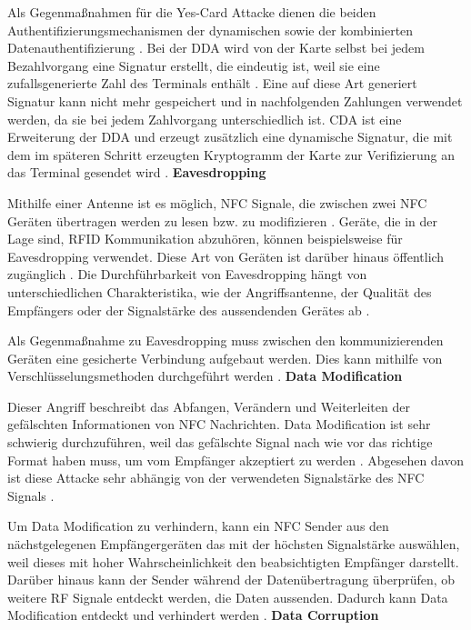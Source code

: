 Als Gegenmaßnahmen für die Yes-Card Attacke dienen die beiden Authentifizierungsmechanismen der dynamischen sowie der kombinierten Datenauthentifizierung \cite{nfcRelayWithOffTheShelfHardAndSoftware}. Bei der DDA wird von der Karte selbst bei jedem Bezahlvorgang eine Signatur erstellt, die eindeutig ist, weil sie eine zufallsgenerierte Zahl des Terminals enthält \cite{dda}. Eine auf diese Art generiert Signatur kann nicht mehr gespeichert und in nachfolgenden Zahlungen verwendet werden, da sie bei jedem Zahlvorgang unterschiedlich ist. CDA ist eine Erweiterung der DDA und erzeugt zusätzlich eine dynamische Signatur, die mit dem im späteren Schritt erzeugten Kryptogramm der Karte zur Verifizierung an das Terminal gesendet wird \cite{emvbook2}. 
\newline
\newline
\textbf{Eavesdropping}

Mithilfe einer Antenne ist es möglich, NFC Signale, die zwischen zwei NFC Geräten übertragen werden zu lesen bzw. zu modifizieren \cite{nfcTechVulnAttack}. Geräte, die in der Lage sind, RFID Kommunikation abzuhören, können beispielsweise für Eavesdropping verwendet. Diese Art von Geräten ist darüber hinaus öffentlich zugänglich \cite{eavesdropNfc}. Die Durchführbarkeit von Eavesdropping hängt von unterschiedlichen Charakteristika, wie der Angriffsantenne, der Qualität des Empfängers oder der Signalstärke des aussendenden Gerätes ab \cite{securityNfc}. 

Als Gegenmaßnahme zu Eavesdropping muss zwischen den kommunizierenden Geräten eine gesicherte Verbindung aufgebaut werden. Dies kann mithilfe von Verschlüsselungsmethoden durchgeführt werden \cite{nfcTechVulnAttack}. 
\newline
\newline
\textbf{Data Modification}

Dieser Angriff beschreibt das Abfangen, Verändern und Weiterleiten der gefälschten Informationen von NFC Nachrichten. Data Modification ist sehr schwierig durchzuführen, weil das gefälschte Signal nach wie vor das richtige Format haben muss, um vom Empfänger akzeptiert zu werden \cite{nfcTechVulnAttack}. Abgesehen davon ist diese Attacke sehr abhängig von der verwendeten Signalstärke des NFC Signals \cite{securityNfc}. 

Um Data Modification zu verhindern, kann ein NFC Sender aus den nächstgelegenen Empfängergeräten das mit der höchsten Signalstärke auswählen, weil dieses mit hoher Wahrscheinlichkeit den beabsichtigten Empfänger darstellt. Darüber hinaus kann der Sender während der Datenübertragung überprüfen, ob weitere RF Signale entdeckt werden, die Daten aussenden. Dadurch kann Data Modification entdeckt und verhindert werden \cite{nfcTechVulnAttack}.
\newline
\newline
\textbf{Data Corruption}

